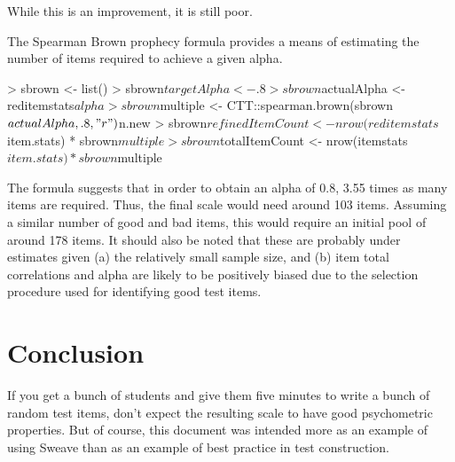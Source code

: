 \documentclass[a4paper]{article}
\begin{document}
While this is an improvement, it is still poor.

The Spearman Brown prophecy formula provides a means of
estimating the number of items required to achieve a given alpha. 

\begin{Schunk}
\begin{Sinput}
> sbrown <- list()
> sbrown$targetAlpha <- .8
> sbrown$actualAlpha <- reditemstats$alpha
> sbrown$multiple <- CTT::spearman.brown(sbrown$actualAlpha , .8, "r")$n.new 
> sbrown$refinedItemCount <- nrow(reditemstats$item.stats) * sbrown$multiple
> sbrown$totalItemCount <- nrow(itemstats$item.stats) * sbrown$multiple 
\end{Sinput}
\end{Schunk}

The formula suggests  that in order to obtain
an alpha of 0.8,
3.55 times as many items are required.
Thus, the final scale would need around
103 items.
Assuming a similar number of good and bad items,
this would require an initial pool of around
178 items.  
It should also be noted that these are probably under estimates
given (a) the relatively small sample size, 
and (b) item total correlations
and alpha are likely to be positively biased due to the selection 
procedure used for identifying good test items. 


\section{Conclusion}
If you get a bunch of students 
and give them five minutes to write a bunch of random test items,
don't expect the resulting scale to have
good psychometric properties.  
But of course, this document was intended more as an example of 
using Sweave than as an example of best practice in test construction. 
\end{document}
